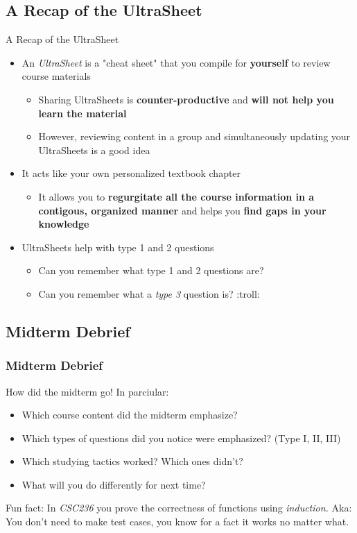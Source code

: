 \documentclass[hyperref={colorlinks,citecolor=blue,linkcolor=blue,urlcolor=blue}]{beamer}
\begin{document}
\subsection{A Recap of the UltraSheet\texttrademark{}}
\begin{frame}{A Recap of the UltraSheet\texttrademark{}}
  \begin{itemize}
    \item An \textit{UltraSheet\texttrademark{}} is a "cheat sheet" that you compile for \textbf{yourself} to review course materials 
    \begin{itemize}
      \item Sharing UltraSheets\texttrademark{} is \textbf{counter-productive} and \textbf{will not help you learn the material}
      \item However, reviewing content in a group and simultaneously updating your UltraSheets\texttrademark{} is a good idea
    \end{itemize}
    \item It acts like your own personalized textbook chapter
    \begin{itemize}
      \item It allows you to \textbf{regurgitate all the course information in a contigous, organized manner} and helps you \textbf{find gaps in your knowledge}
    \end{itemize}
    \item UltraSheets\texttrademark{} help with type 1 and 2 questions 
    \begin{itemize}
      \item Can you remember what type 1 and 2 questions are?
      \item Can you remember what a \textit{type 3} question is? :troll:
    \end{itemize}
  \end{itemize}

\end{frame}

\subsection{Midterm Debrief}
\begin{frame}
  \frametitle{Midterm Debrief}
  How did the midterm go! In parciular:
  \begin{itemize}
    \item Which course content did the midterm emphasize?
    \item Which types of questions did you notice were emphasized? (Type I, II, III)
    \item Which studying tactics worked? Which ones didn't?
    \item What will you do differently for next time?
  \end{itemize}

  Fun fact: In \textit{CSC236} you prove the correctness of functions using \textit{induction.} Aka: You don't need to make test cases, you know for a fact it works no matter what. 
\end{frame}
\end{document}
